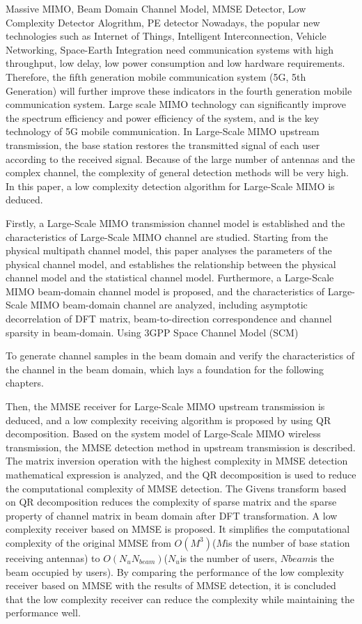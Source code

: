 \documentclass[bachelor,nocolorlinks, printoneside]{seuthesis} %
\begin{document}
\begin{englishabstract}{Massive MIMO, Beam Domain Channel Model, MMSE Detector, Low Complexity Detector Alogrithm, PE detector}
Nowadays, the popular new technologies such as Internet of Things, Intelligent Interconnection, Vehicle Networking, Space-Earth Integration need communication systems with high throughput, low delay, low power consumption and low hardware requirements. Therefore, the fifth generation mobile communication system (5G, 5th Generation) will further improve these indicators in the fourth generation mobile communication system. Large scale MIMO technology can significantly improve the spectrum efficiency and power efficiency of the system, and is the key technology of 5G mobile communication. In Large-Scale MIMO upstream transmission, the base station restores the transmitted signal of each user according to the received signal. Because of the large number of antennas and the complex channel, the complexity of general detection methods will be very high. In this paper, a low complexity detection algorithm for Large-Scale MIMO is deduced.

Firstly, a Large-Scale MIMO transmission channel model is established and the characteristics of Large-Scale MIMO channel are studied. Starting from the physical multipath channel model, this paper analyses the parameters of the physical channel model, and establishes the relationship between the physical channel model and the statistical channel model. Furthermore, a Large-Scale MIMO beam-domain channel model is proposed, and the characteristics of Large-Scale MIMO beam-domain channel are analyzed, including asymptotic decorrelation of DFT matrix, beam-to-direction correspondence and channel sparsity in beam-domain. Using 3GPP Space Channel Model (SCM)

To generate channel samples in the beam domain and verify the characteristics of the channel in the beam domain, which lays a foundation for the following chapters.

Then, the MMSE receiver for Large-Scale MIMO upstream transmission is deduced, and a low complexity receiving algorithm is proposed by using QR decomposition. Based on the system model of Large-Scale MIMO wireless transmission, the MMSE detection method in upstream transmission is described. The matrix inversion operation with the highest complexity in MMSE detection mathematical expression is analyzed, and the QR decomposition is used to reduce the computational complexity of MMSE detection. The Givens transform based on QR decomposition reduces the complexity of sparse matrix and the sparse property of channel matrix in beam domain after DFT transformation. A low complexity receiver based on MMSE is proposed. It simplifies the computational complexity of the original MMSE from $O(M^3) $($M $is the number of base station receiving antennas) to $O(N_uN_{beam}) $($N_u$is the number of users, $N {beam}$is the beam occupied by users). By comparing the performance of the low complexity receiver based on MMSE with the results of MMSE detection, it is concluded that the low complexity receiver can reduce the complexity while maintaining the performance well.


\end{englishabstract}
\end{document}
